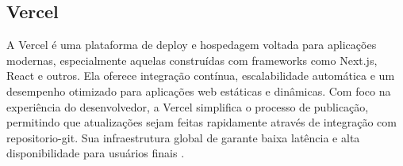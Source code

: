 




\subsection{Vercel}
A Vercel é uma plataforma de \gls{deploy} e hospedagem voltada para aplicações modernas, especialmente aquelas construídas com \glspl{framework} como Next.js, React e outros. Ela oferece integração contínua, escalabilidade automática e um desempenho otimizado para aplicações web estáticas e dinâmicas. Com foco na experiência do desenvolvedor, a Vercel simplifica o processo de publicação, permitindo que atualizações sejam feitas rapidamente através de integração com \gls{repositorio-git}. Sua infraestrutura global de  garante baixa latência e alta disponibilidade para usuários finais \citep{vercel}.

